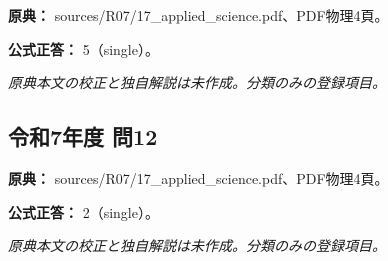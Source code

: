\noindent\textbf{原典：} sources/R07/17\_applied\_science.pdf、PDF物理4頁。

\textbf{公式正答：} 5（single）。

\par\textit{原典本文の校正と独自解説は未作成。分類のみの登録項目。}

\subsection{令和7年度 問12}
\label{q:r07-reg-applied-12}

\noindent\textbf{原典：} sources/R07/17\_applied\_science.pdf、PDF物理4頁。

\textbf{公式正答：} 2（single）。

\par\textit{原典本文の校正と独自解説は未作成。分類のみの登録項目。}
